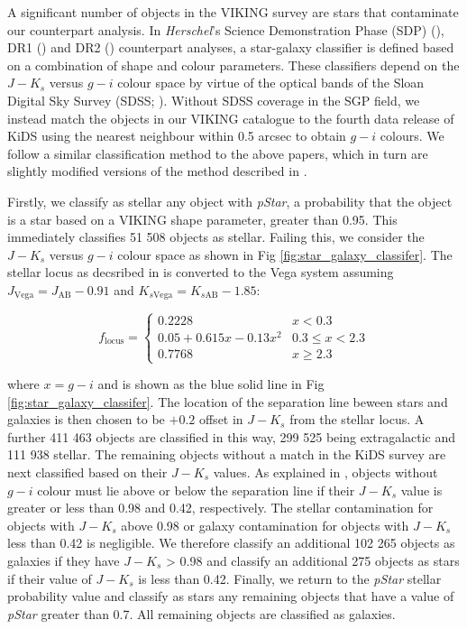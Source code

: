 \documentclass[fleqn,usenatbib]{mnras}
\begin{document}
A significant number of objects in the VIKING survey are stars that contaminate our counterpart analysis. In \textit{Herschel}'s Science Demonstration Phase (SDP) (\citealt{Fleuren_2012}), DR1 (\citealt{Bourne_2016}) and DR2 (\citealt{Furlanetto_2018}) counterpart analyses, a star-galaxy classifier is defined based on a combination of shape and colour parameters. These classifiers depend on the $J - K_s$ versus $g - i$ colour space by virtue of the optical bands of the Sloan Digital Sky Survey (SDSS; \citealt{Abazajian_2009}). Without SDSS coverage in the SGP field, we instead match the objects in our VIKING catalogue to the fourth data release of KiDS using the nearest neighbour within 0.5 arcsec to obtain $g - i$ colours. We follow a similar classification method to the above papers, which in turn are slightly modified versions of the method described in \citealt{Baldry_2010}.

Firstly, we classify as stellar any object with \textit{pStar}, a probability that the object is a star based on a VIKING shape parameter, greater than 0.95. This immediately classifies 51 508 objects as stellar. Failing this, we consider the $J - K_s$ versus $g - i$ colour space as shown in Fig \ref{fig:star_galaxy_classifer}. The stellar locus as decsribed in \citealt{Baldry_2010} is converted to the Vega system assuming $J_{\textrm{Vega}} = J_{\textrm{AB}} - 0.91$ and $K_{s \textrm{Vega}} = K_{s \textrm{AB}} - 1.85$:

\begin{equation}
\label{eq:stellar_locus}
f_{\textrm{locus}} = 
\begin{cases} 
	0.2228 & x < 0.3 \\
	0.05 + 0.615x - 0.13x^2 & 0.3 \leq x < 2.3 \\
	0.7768 & x \geq 2.3
\end{cases}
\end{equation}

\noindent where $x = g-i$ and is shown as the blue solid line in Fig \ref{fig:star_galaxy_classifer}. The location of the separation line beween stars and galaxies is then chosen to be $+0.2$ offset in $J - K_s$ from the stellar locus. A further 411 463 objects are classified in this way, 299 525 being extragalactic and 111 938 stellar. The remaining objects without a match in the KiDS survey are next classified based on their $J - K_s$ values. As explained in \citealt{Fleuren_2012}, objects without $g - i$ colour must lie above or below the separation line if their $J - K_s$ value is greater or less than 0.98 and 0.42, respectively. The stellar contamination for objects with $J - K_s$ above 0.98 or galaxy contamination for objects with $J - K_s$ less than 0.42 is negligible. We therefore classify an additional 102 265 objects as galaxies if they have $J - K_s$ > 0.98 and classify an additional 275 objects as stars if their value of $J - K_s$ is less than 0.42. Finally, we return to the \textit{pStar} stellar probability value and classify as stars any remaining objects that have a value of \textit{pStar} greater than 0.7. All remaining objects are classified as galaxies.
\end{document}
